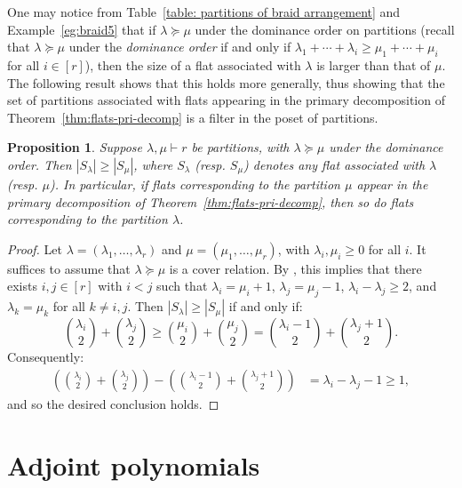 \documentclass [a4paper,reqno, 11pt]{amsart}
\theoremstyle{plain}
\theoremstyle{plain}
\theoremstyle{plain}
\newtheorem{proposition}[theorem]{Proposition}
\theoremstyle{plain}
\theoremstyle{definition}
\theoremstyle{definition}
\theoremstyle{definition}
\theoremstyle{definition}
\theoremstyle{definition}
\theoremstyle{definition}
\begin{document}
One may notice from Table~\ref{table: partitions of braid arrangement} and Example~\ref{eg:braid5} that if $\lambda\succeq\mu$ under the dominance order on partitions (recall that $\lambda\succeq\mu$ under the \emph{dominance order} if and only if $\lambda_1+\cdots+\lambda_i\geq\mu_1+\cdots+\mu_i$ for all $i\in[r]$), then the size of a flat associated with $\lambda$ is larger than that of $\mu$. The following result shows that this holds more generally, thus showing that the set of partitions associated with flats appearing in the primary decomposition of Theorem~\ref{thm:flats-pri-decomp} is a filter in the poset of partitions.


\begin{proposition}\label{prop:braid}
    Suppose $\lambda,\mu\vdash r$ be partitions, with $\lambda\succeq\mu$ under the dominance order. Then $|S_\lambda|\geq |S_\mu|$, where $S_\lambda$ (resp. $S_\mu$) denotes any flat associated with $\lambda$ (resp. $\mu$). In particular, if flats corresponding to the partition $\mu$ appear in the primary decomposition of Theorem~\ref{thm:flats-pri-decomp}, then so do flats corresponding to the partition $\lambda$. 
\end{proposition}

\begin{proof}
    Let $\lambda=(\lambda_1,\ldots,\lambda_r)$ and $\mu=(\mu_1,\ldots,\mu_r)$, with $\lambda_i,\mu_i\geq 0$ for all $i$. It suffices to assume that $\lambda\succeq\mu$ is a cover relation. By \cite[Proposition 2.3]{Bry}, this implies that there exists $i,j\in [r]$ with $i<j$ such that $\lambda_i=\mu_i+1$, $\lambda_j=\mu_j-1$, $\lambda_i-\lambda_j\geq 2$, and $\lambda_k=\mu_k$ for all $k\neq i,j$. Then $|S_\lambda|\geq |S_\mu|$ if and only if:
    \[\binom{\lambda_i}{2}+\binom{\lambda_j}{2}\geq\binom{\mu_i}{2}+\binom{\mu_j}{2}=\binom{\lambda_i-1}{2}+\binom{\lambda_j+1}{2}.\]
Consequently:
    \begin{align*}
        \left(\binom{\lambda_i}{2}+\binom{\lambda_j}{2}\right)-\left(\binom{\lambda_i-1}{2}+\binom{\lambda_j+1}{2}\right)&=\lambda_i-\lambda_j-1\geq 1,
    \end{align*}
    and so the desired conclusion holds.
\end{proof}



\section{Adjoint polynomials}\label{sec: polytope adjoint polynomial}
\end{document}
